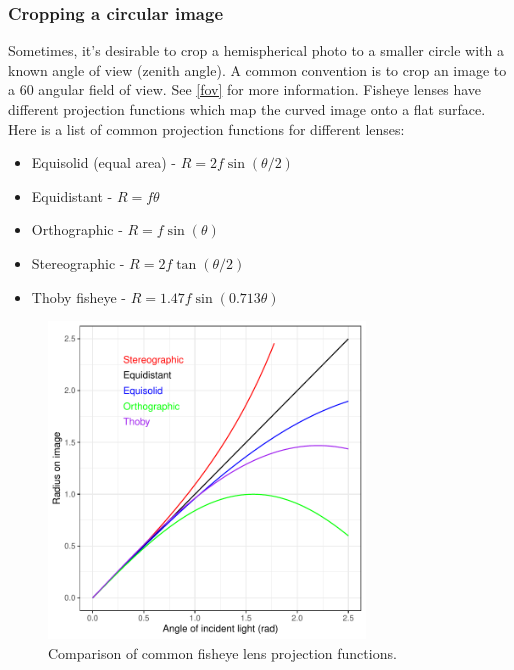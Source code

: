 \documentclass[11pt,a4paper]{article}
\newcommand\file[1]{\texttt{\underline{#1}}}  %
\begin{document}
\begin{minipage}{\linewidth}

\end{minipage}

\subsubsection{Cropping a circular image} \label{circle}

Sometimes, it's desirable to crop a hemispherical photo to a smaller circle with a known angle of view (zenith angle). A common convention is to crop an image to a 60\textdegree{} angular field of view. See \autoref{fov} for more information. Fisheye lenses have different projection functions which map the curved image onto a flat surface. Here is a list of common projection functions for different lenses:

\begin{itemize}
	\item{Equisolid (equal area) - $R = 2f\sin{(\theta/2)}$}
	\item{Equidistant - $R = f\theta$}
	\item{Orthographic - $R = f\sin{(\theta)}$}
	\item{Stereographic - $R = 2f\tan{(\theta/2)}$}
	\item{Thoby fisheye - $R = 1.47f\sin{(0.713\theta)}$}
\end{itemize}

\begin{figure}[H]
	\includegraphics[width=0.75\textwidth]{lens_proj}
	\caption{Comparison of common fisheye lens projection functions.}
	\label{lens_proj}
\end{figure}
\end{document}
